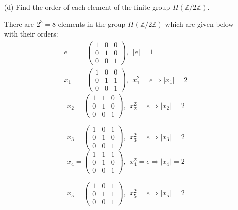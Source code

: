 \documentclass[12pt]{article}
\begin{document}
\begin{enumerate}
\begin{enumerate}
        \item[(d)] Find the order of each element of the
        finite group $H(\mathbb{Z}/2\mathbb{Z})$.
        \begin{mybox}
            
            There are $2^3=8$ elements in the group
            $H(\mathbb{Z}/2\mathbb{Z})$ which are given
            below with their orders:
            \begin{align*}
                e=&\left(\begin{array}{ccc}
                        1 & 0 & 0\\
                        0 & 1 & 0\\
                        0 & 0 & 1 \end{array}
                    \right),\ \ |e|=1\\
                x_1=&\left(\begin{array}{ccc}
                        1 & 0 & 0\\
                        0 & 1 & 1\\
                        0 & 0 & 1 \end{array}
                    \right),\ \ x_1^2=e\Longrightarrow |x_1|=2
            \end{align*}
            $$x_2=\left(\begin{array}{ccc}
                    1 & 1 & 0\\
                    0 & 1 & 0\\
                    0 & 0 & 1 \end{array}
                \right),\ \ x_2^2=e\Longrightarrow |x_2|=2$$
            
            $$x_3=\left(\begin{array}{ccc}
                    1 & 0 & 1\\
                    0 & 1 & 0\\
                    0 & 0 & 1 \end{array}
                \right),\ \ x_3^2=e\Longrightarrow |x_3|=2$$
            $$x_4=\left(\begin{array}{ccc}
                    1 & 1 & 1\\
                    0 & 1 & 0\\
                    0 & 0 & 1 \end{array}
                \right),\ \ x_4^2=e\Longrightarrow |x_4|=2$$
            
            $$x_5=\left(\begin{array}{ccc}
                    1 & 0 & 1\\
                    0 & 1 & 1\\
                    0 & 0 & 1 \end{array}
                \right),\ \ x_5^2=e\Longrightarrow |x_5|=2$$
            

\end{mybox}
\end{enumerate}
\end{enumerate}
\end{document}
